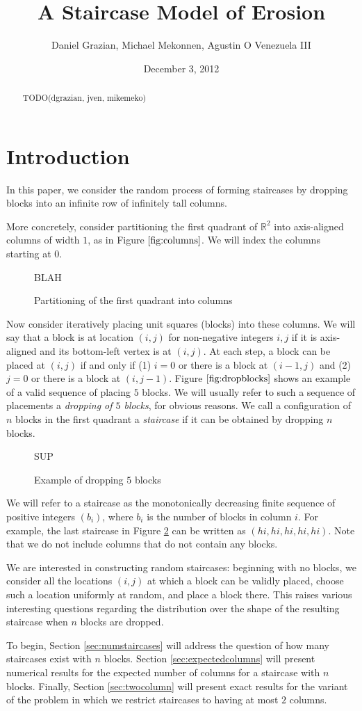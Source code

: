 \documentclass[12pt]{amsart}
\title{A Staircase Model of Erosion}
\author{Daniel Grazian, Michael Mekonnen, Agustin O Venezuela III}
\date{December 3, 2012}
\newcommand{\R}{\mathbb{R}}
\newcommand{\newfigure}[3]{
\begin{figure}
#3
\caption{#2 \label{#1}}
\end{figure}
}
\newcommand{\newsection}[2]{
\section{#1 \label{#2}}
}
\begin{document}
\begin{abstract}
TODO(dgrazian, jven, mikemeko)
\end{abstract}

\maketitle

\newsection{Introduction}{sec:intro}
In this paper, we consider the random process of forming staircases by dropping blocks into an infinite row of infinitely tall columns.

More concretely, consider partitioning the first quadrant of $\R^2$ into axis-aligned columns of width $1$, as in Figure $\ref{fig:columns}$. We will index the columns starting at $0$.

\newfigure{fig:columns}{Partitioning of the first quadrant into columns}{
BLAH
}

Now consider iteratively placing unit squares (blocks) into these columns. We will say that a block is at location $(i, j)$ for non-negative integers $i, j$ if it is axis-aligned and its bottom-left vertex is at $(i, j)$. At each step, a block can be placed at $(i, j)$ if and only if (1) $i = 0$ or there is a block at $(i - 1, j)$ and (2) $j = 0$ or there is a block at $(i, j - 1)$. Figure $\ref{fig:dropblocks}$ shows an example of a valid sequence of placing $5$ blocks. We will usually refer to such a sequence of placements a \textit{dropping of $5$ blocks}, for obvious reasons. We call a configuration of $n$ blocks in the first quadrant a \textit{staircase} if it can be obtained by dropping $n$ blocks.

\newfigure{fig:dropblocks}{Example of dropping $5$ blocks}{
SUP
}

We will refer to a staircase as the monotonically decreasing finite sequence of positive integers $(b_i)$, where $b_i$ is the number of blocks in column $i$. For example, the last staircase in Figure \ref{fig:dropblocks} can be written as $(hi,hi,hi,hi,hi)$. Note that we do not include columns that do not contain any blocks.

We are interested in constructing random staircases: beginning with no blocks, we consider all the locations $(i, j)$ at which a block can be validly placed, choose such a location uniformly at random, and place a block there. This raises various interesting questions regarding the distribution over the shape of the resulting staircase when $n$ blocks are dropped.

To begin, Section \ref{sec:numstaircases} will address the question of how many staircases exist with $n$ blocks. Section \ref{sec:expectedcolumns} will present numerical results for the expected number of columns for a staircase with $n$ blocks. Finally, Section \ref{sec:twocolumn} will present exact results for the variant of the problem in which we restrict staircases to having at most $2$ columns.
\end{document}
